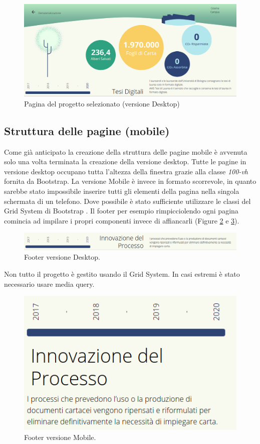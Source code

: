 \begin{figure}[H]
    \centering
    \includegraphics[width=0.9\linewidth]{img/fourth.png}
    \caption{Pagina del progetto selezionato (versione Desktop)}
    \label{fig:projSelDesk}
\end{figure}

\subsection{Struttura delle pagine (mobile)}
\noindent Come già anticipato la creazione della struttura delle pagine mobile è avvenuta solo una volta terminata la creazione della versione desktop.\newline
Tutte le pagine in versione desktop occupano tutta l'altezza della finestra grazie alla classe \textit{100-vh} fornita da Bootstrap. La versione Mobile è invece in formato scorrevole, in quanto sarebbe stato impossibile inserire tutti gli elementi della pagina nella singola schermata di un telefono.\newline
Dove possibile è stato sufficiente utilizzare le classi del Grid System di Bootstrap \cite{bootstrapGrid}. Il footer per esempio rimpicciolendo ogni pagina comincia ad impilare i propri componenti invece di affiancarli (Figure \ref{fig:footDesk} e \ref{fig:footMob}).
\begin{figure}[H]
    \centering
    \includegraphics[width=\linewidth]{img/footer-desktop.png}
    \caption{Footer versione Desktop.}
    \label{fig:footDesk}
\end{figure}
\noindent Non tutto il progetto è gestito usando il Grid System. In casi estremi è stato necessario usare media query.
\begin{figure}[H]
    \centering
    \includegraphics[width=0.5\linewidth]{img/footer-mobile.png}
    \caption{Footer versione Mobile.}
    \label{fig:footMob}
\end{figure}

